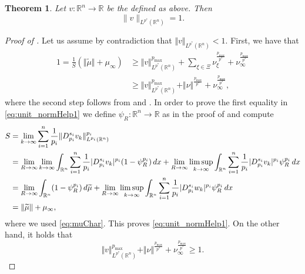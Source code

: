 \documentclass[10pt,a4paper]{amsart}
\newtheorem{theorem}{Theorem}
\newcommand{\R}{\mathbb{R}}
\renewcommand{\d}{\textnormal{d}}
\begin{document}
\begin{theorem} \label{thm:unit_norm}
Let $v:\R^n\to\R$ be the defined as above. Then
\[\|v\|_{L^{p^{\ast}}(\mathbb{R}^n)} = 1.\]
\end{theorem}

\begin{proof} [Proof of ]
Let us assume by contradiction that $\Vert v \Vert_{L^{p^{\ast}}(\R^n)} < 1$.
First, we have that
\begin{equation}\label{eq:unit_normHelp1}
\begin{aligned}
1 = \frac{1}{S} \left(\Vert \widetilde{\mu}\Vert + \mu_{\infty}\right) & \ge \Vert v \Vert_{L^{p^{\ast}}(\R^n)}^{p_{\max}} + \sum_{\xi\in\Xi} \nu_{\xi}^{\frac{p_{\max}}{p^{\ast}}} + \nu_{\infty}^{\frac{p_{\max}}{p^{\ast}}} \\
& \ge \Vert v \Vert_{L^{p^{\ast}}(\R^n)}^{p_{\max}} + \Vert \nu \Vert^{\frac{p_{\max}}{p^{\ast}}} + \nu_{\infty}^{\frac{p_{\max}}{p^{\ast}}},
\end{aligned}
\end{equation}
where the second step follows from  and . In order to prove the first equality in \eqref{eq:unit_normHelp1} we define $\psi_R : \R^n \to \R$ as in the proof of  and compute
\begin{equation*}
\begin{split}
S &= \lim_{k \to \infty} \sum_{i=1}^n\frac{1}{p_i} \Vert D_{p_i}^{s_i}v_k \Vert_{L^{p_i}(\R^n)}^{p_i}\\
&= \lim_{R \to \infty} \lim_{k \to \infty} \int_{\R^n} \sum_{i=1}^n \frac{1}{p_i}\vert D^{s_i}_{p_i}v_k\vert^{p_i}(1-\psi_R^{p_i}) \,  \d x + \lim_{R \to \infty} \limsup_{k \to \infty} \int_{\R^n} \sum_{i=1}^n \frac{1}{p_i}\vert D^{s_i}_{p_i}v_k\vert^{p_i} \psi_R^{p_i} \, \d x\\
&= \lim_{R \to \infty} \int_{\R^n} (1-\psi_R^{p_i}) \, \d \widetilde{\mu} + \lim_{R \to \infty} \limsup_{k \to \infty} \int_{\R^n} \sum_{i=1}^n \frac{1}{p_i}\vert D^{s_i}_{p_i}w_k\vert^{p_i} \psi_R^{p_i} \, \d x\\
&= \Vert \widetilde{\mu} \Vert + \mu_{\infty},
\end{split}
\end{equation*}
where we used \eqref{eq:muChar}. This proves \eqref{eq:unit_normHelp1}.
On the other hand, it holds that
\begin{equation}
\label{eq:unit_normHelp2}
\Vert v \Vert_{L^{p^{\ast}}(\R^n)}^{p_{\max}} + \Vert \nu \Vert^{\frac{p_{\max}}{p^{\ast}}} + \nu_{\infty}^{\frac{p_{\max}}{p^{\ast}}} \ge 1.

\end{equation}
\end{proof}
\end{document}

